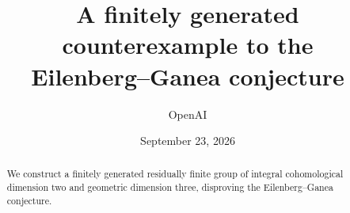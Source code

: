 \documentclass[11pt]{article}
\title{A finitely generated counterexample to the\protect\\ Eilenberg--Ganea conjecture}
\author{OpenAI}
\date{September 23, 2026}
\numberwithin{equation}{section}
\theoremstyle{definition}
\theoremstyle{remark}
\begin{document}
\maketitle
\begin{abstract}
We construct a finitely generated residually finite group of integral cohomological dimension two and geometric dimension three, disproving the Eilenberg--Ganea conjecture.
\end{abstract}








\end{document}
